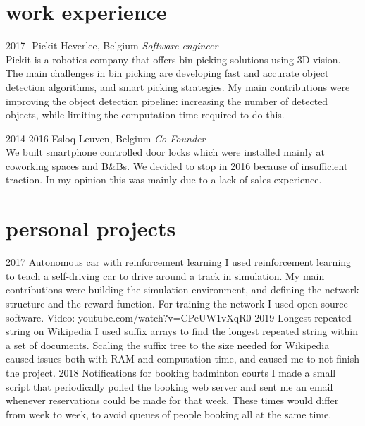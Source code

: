 \documentclass[]{twentysecondcv}
\begin{document}
\section{work experience}
\begin{twenty}
  \twentyitem
    {2017-}
    {Pickit}
    {Heverlee, Belgium}
    {\textit{Software engineer}\\Pickit is a robotics company that offers bin picking solutions using 3D vision. The main challenges in bin picking are developing fast and accurate object detection algorithms, and smart picking strategies. My main contributions were improving the object detection pipeline: increasing the number of detected objects, while limiting the computation time required to do this.}

  \twentyitem
    {2014-2016}
    {Esloq}
    {Leuven, Belgium}
    {\textit{Co Founder}\\We built smartphone controlled door locks which were installed mainly at coworking spaces and B\&Bs. We decided to stop in 2016 because of insufficient traction. In my opinion this was mainly due to a lack of sales experience.}
\end{twenty}

\section{personal projects}
\begin{twenty}
  \twentyitem
    {2017}
    {Autonomous car with reinforcement learning}
    {}
    {I used reinforcement learning to teach a self-driving car to drive around a track in simulation. My main contributions were building the simulation environment, and defining the network structure and the reward function. For training the network I used open source software. Video: youtube.com/watch?v=CPeUW1vXqR0}
  \twentyitem
    {2019}
    {Longest repeated string on Wikipedia}
    {}
    {I used suffix arrays to find the longest repeated string within a set of documents. Scaling the suffix tree to the size needed for Wikipedia caused issues both with RAM and computation time, and caused me to not finish the project.}
  \twentyitem
    {2018}
    {Notifications for booking badminton courts}
    {}
    {I made a small script that periodically polled the booking web server and sent me an email whenever reservations could be made for that week. These times would differ from week to week, to avoid queues of people booking all at the same time.}
\end{twenty}
\end{document}
